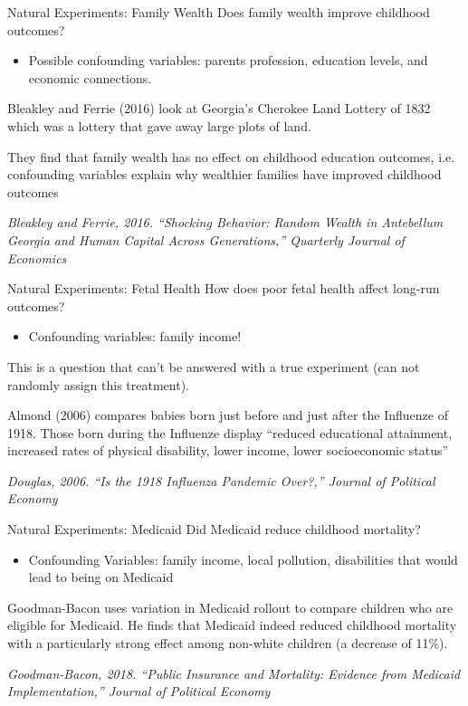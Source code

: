 \documentclass{beamer}
\begin{document}
\begin{frame}{Natural Experiments: Family Wealth}	
	Does family wealth improve childhood outcomes?
	
	\begin{itemize}
		\item Possible confounding variables: parents profession, education levels, and economic connections.
	\end{itemize}
	
	Bleakley and Ferrie (2016) look at Georgia’s Cherokee Land Lottery of 1832 which was a lottery that gave away large plots of land. 
	
	They find that family wealth has no effect on childhood education outcomes, i.e. confounding variables explain why wealthier families have improved childhood outcomes

	\textit{Bleakley and Ferrie, 2016. ``Shocking Behavior: Random Wealth in Antebellum Georgia and Human Capital Across Generations,'' Quarterly Journal of Economics}
\end{frame}

\begin{frame}{Natural Experiments: Fetal Health}
	How does poor fetal health affect long-run outcomes?

	\begin{itemize}
		\item Confounding variables: family income!
	\end{itemize}	

	This is a question that can't be answered with a true experiment (can not randomly assign this treatment).

	Almond (2006) compares babies born just before and just after the Influenze of 1918. Those born during the Influenze display ``reduced educational attainment, increased rates of physical disability, lower income, lower socioeconomic status''

	\textit{Douglas, 2006. ``Is the 1918 Influenza Pandemic Over?,'' Journal of Political Economy}
\end{frame}

\begin{frame}{Natural Experiments: Medicaid}
	Did Medicaid reduce childhood mortality?

	\begin{itemize}
		\item Confounding Variables: family income, local pollution, disabilities that would lead to being on Medicaid
	\end{itemize}

	Goodman-Bacon uses variation in Medicaid rollout to compare children who are eligible for Medicaid. He finds that Medicaid indeed reduced childhood mortality with a particularly strong effect among non-white children (a decrease of 11\%).

	\textit{Goodman-Bacon, 2018. ``Public Insurance and Mortality: Evidence from Medicaid Implementation,'' Journal of Political Economy}
	

\end{frame}
\end{document}
